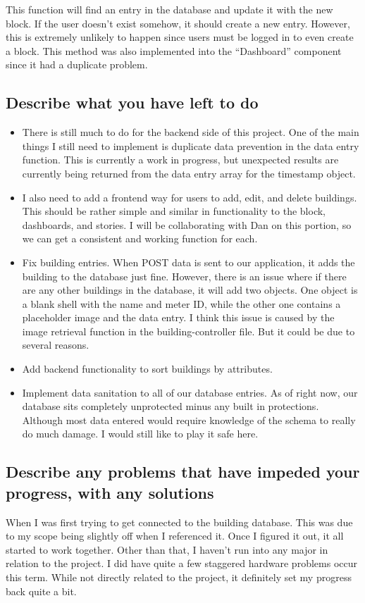 \documentclass[letterpaper,10pt,serif,draftclsnofoot,onecolumn,compsoc,titlepage]{IEEEtran}
\begin{document}
\noindent This function will find an entry in the database and update it with the new block. If the user doesn't exist somehow, it should create a new entry. However, this is extremely unlikely to happen since users must be logged in to even create a block. This method was also implemented into the ``Dashboard'' component since it had a duplicate problem.


\subsection{Describe what you have left to do}
\begin{itemize}
\item There is still much to do for the backend side of this project. One of the main things I still need to implement is duplicate data prevention in the data entry function. This is currently a work in progress, but unexpected results are currently being returned from the data entry array for the timestamp object. 
\item I also need to add a frontend way for users to add, edit, and delete buildings. This should be rather simple and similar in functionality to the block, dashboards, and stories. I will be collaborating with Dan on this portion, so we can get a consistent and working function for each.
\item Fix building entries. When POST data is sent to our application, it adds the building to the database just fine. However, there is an issue where if there are any other buildings in the database, it will add two objects. One object is a blank shell with the name and meter ID, while the other one contains a placeholder image and the data entry. I think this issue is caused by the image retrieval function in the building-controller file. But it could be due to several reasons.
\item Add backend functionality to sort buildings by attributes.
\item Implement data sanitation to all of our database entries. As of right now, our database sits completely unprotected minus any built in protections. Although most data entered would require knowledge of the schema to really do much damage. I would still like to play it safe here.
\end{itemize}
\subsection{Describe any problems that have impeded your progress, with any solutions}
When I was first trying to get connected to the building database. This was due to my scope being slightly off when I referenced it. Once I figured it out, it all started to work together. Other than that, I haven't run into any major in relation to the project. I did have quite a few staggered hardware problems occur this term. While not directly related to the project, it definitely set my progress back quite a bit.
\end{document}
